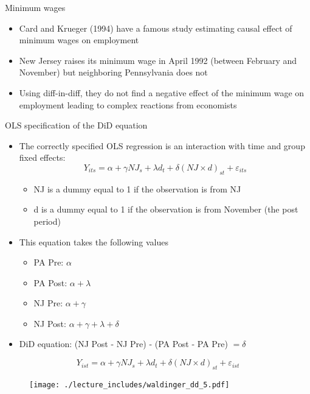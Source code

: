 \documentclass{beamer}
\begin{document}
\begin{frame}{Minimum wages}

\begin{itemize}
\item Card and Krueger (1994) have a famous study estimating causal effect of minimum wages on employment
\item  New Jersey raises its minimum wage in April 1992 (between February and November) but neighboring Pennsylvania does not
\item Using diff-in-diff, they do not find a negative effect of the minimum wage on employment leading to complex reactions from economists
\end{itemize}

\end{frame}





\begin{frame}{OLS specification of the DiD equation}
	
	\begin{itemize}
	\item The correctly specified OLS regression is an interaction with time and group fixed effects:$$Y_{its} = \alpha + \gamma NJ_s + \lambda d_t + \delta (NJ \times d)_{st} + \varepsilon_{its}$$
		\begin{itemize}
		\item NJ is a dummy equal to 1 if the observation is from NJ
		\item d is a dummy equal to 1 if the observation is from November (the post period)
		\end{itemize}
	\item This equation takes the following values
		\begin{itemize}
		\item PA Pre: $\alpha$
		\item PA Post: $\alpha + \lambda$
		\item NJ Pre: $\alpha + \gamma$
		\item NJ Post: $\alpha + \gamma + \lambda + \delta$
		\end{itemize}
	\item DiD equation: (NJ Post - NJ Pre) - (PA Post - PA Pre) $= \delta$
	\end{itemize}
\end{frame}




\begin{frame}[plain]
	$$Y_{ist} = \alpha + \gamma NJ_s + \lambda d_t + \delta(NJ\times d)_{st} + \varepsilon_{ist}$$
	\begin{figure}
	\texttt{[image: ./lecture\_includes/waldinger\_dd\_5.pdf]}
	\end{figure}
\end{frame}
\end{document}
